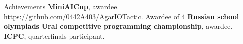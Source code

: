 \begin{rubric}{Achievements}
\entry*[2018]
	\textbf{MiniAICup}, awardee. \url{https://github.com/0442A403/AgarIOTactic}.
\entry*[2019]
	Awardee of 4 \textbf{Russian school olympiads}
\entry*[2019]
	\textbf{Ural competitive programming championship}, awardee.
\entry*[2020]
	\textbf{ICPC}, quarterfinals participant.
\end{rubric}